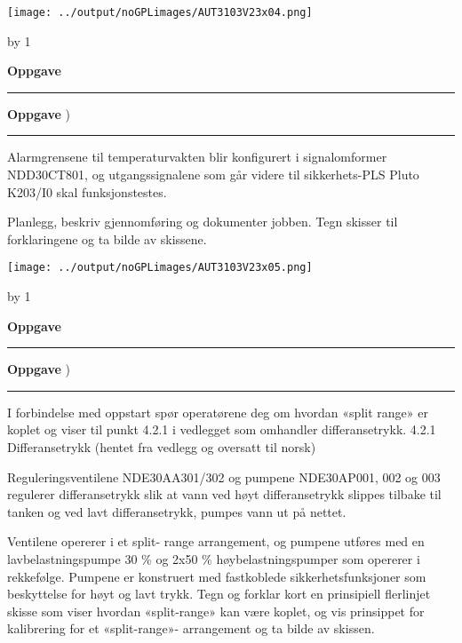 \documentclass[12pt,a4paper]{article}
\def\oppgave{
            \advance\questnum by 1
	    \ifthenelse{\questnum>0\AND \questnum<9}
	    {
                \vskip 1cm
		\textbf{Oppgave}\hskip 5pt\the\questnum \hfill \hfill
		\vskip 3pt
		\hrule
	\vskip 0.5cm}
	{
                \vskip 1cm
		\textbf{Oppgave}\hskip 5pt \the\questnum \hfill \hfill)
		\vskip 3pt \hrule \vskip 0.5cm }

		}
\begin{document}
\vskip 0.25cm
\texttt{[image: ../output/noGPLimages/AUT3103V23x04.png]}\\
\newpage
\oppgave{}%
Alarmgrensene til temperaturvakten blir konfigurert i signalomformer NDD30CT801, og utgangssignalene som går videre til sikkerhets-PLS Pluto K203/I0 skal funksjonstestes. 

\vskip 0.25cm
Planlegg, beskriv gjennomføring og dokumenter jobben. Tegn skisser til forklaringene og ta bilde av skissene.


\vskip 0.25cm
\texttt{[image: ../output/noGPLimages/AUT3103V23x05.png]}\\
\newpage
\oppgave{}%
I forbindelse med oppstart spør operatørene deg om hvordan «split range» er koplet og viser til punkt 4.2.1 i vedlegget som omhandler differansetrykk.
\vskip 0.25cm
4.2.1 Differansetrykk (hentet fra vedlegg og oversatt til norsk)

\vskip 0.25cm
Reguleringsventilene NDE30AA301/302 og pumpene NDE30AP001, 002 og 003 regulerer differansetrykk slik at vann ved høyt differansetrykk slippes tilbake til tanken og ved lavt differansetrykk, pumpes vann ut på nettet.

\vskip 0.25cm
Ventilene opererer i et split- range arrangement, og pumpene utføres med en lavbelastningspumpe 30 \% og 2x50 \% høybelastningspumper som opererer i rekkefølge.
\vskip 0.25cm
Pumpene er konstruert med fastkoblede sikkerhetsfunksjoner som beskyttelse for høyt og lavt trykk.
\vskip 0.25cm
Tegn og forklar kort en prinsipiell flerlinjet skisse som viser hvordan «split-range» kan være koplet, og vis prinsippet for kalibrering for et «split-range»- arrangement og ta bilde av skissen. 
\vskip 0.25cm


\vskip 0.25cm
\newpage
\end{document}
